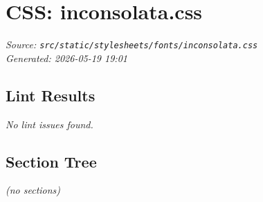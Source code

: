 
\section*{CSS: inconsolata.css}
\textit{Source: \texttt{src/static/stylesheets/fonts/inconsolata.css}} \\
\textit{Generated: 2026-05-19 19:01} \\[0.5em]

\subsection*{Lint Results}
\textit{No lint issues found.} \\

\subsection*{Section Tree}

\noindent
\textit{(no sections)}
